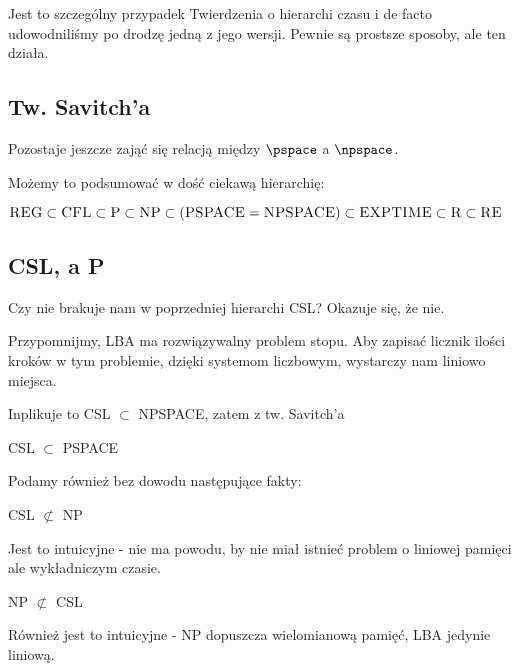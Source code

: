 Jest to szczególny przypadek Twierdzenia o hierarchi czasu i de facto udowodniliśmy po drodzę jedną z jego wersji. Pewnie są prostsze sposoby, ale ten działa.

\subsection{Tw. Savitch'a}

Pozostaje jeszcze zająć się relacją między \( \pspace\) a \(\npspace \).



Możemy to podsumować w dość ciekawą hierarchię:

\begin{corollary}
    \( \textsc{REG} \subset \textsc{CFL} \subset \textsc{P} \subset \textsc{NP} \subset (\textsc{PSPACE} = \textsc{NPSPACE}) \subset \textsc{EXPTIME} \subset \textsc{R} 
    \subset \textsc{RE} \)
\end{corollary}

\subsection{CSL, a P}

Czy nie brakuje nam w poprzedniej hierarchi CSL? Okazuje się, że nie.

Przypomnijmy, LBA ma rozwiązywalny problem stopu. Aby zapisać licznik ilości kroków w tym problemie, dzięki systemom liczbowym, wystarczy nam liniowo miejsca.

Inplikuje to CSL \(\subset\) NPSPACE, zatem z tw. Savitch'a

\begin{corollary}
    CSL \(\subset\) PSPACE
\end{corollary}

Podamy również bez dowodu następujące fakty:

\begin{lemma}
    CSL \( \not \subset \) NP
\end{lemma}

Jest to intuicyjne - nie ma powodu, by nie miał istnieć problem o liniowej pamięci ale wykładniczym czasie.

\begin{lemma}
    NP \( \not \subset \) CSL
\end{lemma}

Również jest to intuicyjne - NP dopuszcza wielomianową pamięć, LBA jedynie liniową.

